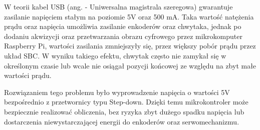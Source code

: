 W teorii kabel USB (ang.  - Uniwersalna magistrala szeregowa) gwarantuje zasilanie napięciem stałym na poziomie 5V oraz 500 mA. Taka wartość natężenia prądu oraz napięcia umożliwia zasilanie enkoderów oraz chwytaka, jednak po dodaniu akwizycji oraz przetwarzania obrazu cyfrowego przez mikrokomputer Raspberry Pi, wartości zasilania zmniejszyły się, przez większy pobór prądu przez układ SBC. W wyniku takiego efektu, chwytak często nie zamykał się w określonym czasie lub wcale nie osiągał pozycji końcowej ze względu na zbyt małe wartości prądu. 

Rozwiązaniem tego problemu było wyprowadzenie napięcia o wartości 5V bezpośrednio z przetwornicy typu Step-down. Dzięki temu mikrokontroler może bezpiecznie realizować obliczenia, bez ryzyka zbyt dużego spadku napięcia lub dostarczenia niewystarczającej energii do enkoderów oraz serwomechanizmu. 